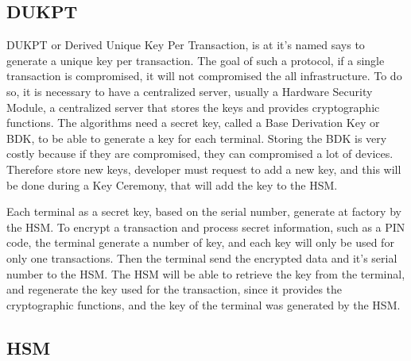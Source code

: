 \documentclass[10pt,a4paper]{article}
\begin{document}
\subsection{DUKPT}

DUKPT or Derived Unique Key Per Transaction, is at it's named
says to generate a unique key per transaction.
The goal of such a protocol, if a single transaction is compromised,
it will not compromised the all infrastructure.
To do so, it is necessary to have a centralized server, usually
a Hardware Security Module, a centralized server that stores
the keys and provides cryptographic functions.
The algorithms need a secret key,
called a Base Derivation Key or BDK, to be able to generate
a key for each terminal. Storing the BDK is very costly because
if they are compromised, they can compromised a lot of devices.
Therefore store new keys, developer must request to add a new
key, and this will be done during a Key Ceremony, that will
add the key to the HSM.


Each terminal as a secret key, based on the serial number,
generate at factory by the HSM. To encrypt a transaction and process
secret information, such as a PIN code, the terminal generate a number
of key, and each key will only be used for only one transactions.
Then the terminal send the encrypted data and it's serial number to the HSM.
The HSM will be able to retrieve the key from the terminal, and
regenerate the key used for the transaction, since it provides
the cryptographic functions, and the
key of the terminal was generated by the HSM.


\subsection{HSM}




\label{sec:hsm}




\end{document}

